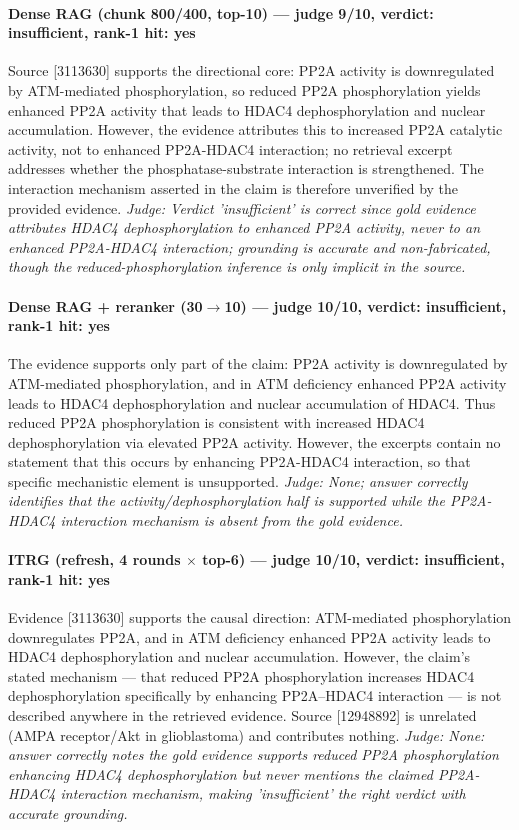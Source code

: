 \documentclass[sigconf, review, anonymous]{acmart}
\begin{document}
\paragraph{Dense RAG (chunk 800/400, top-10) --- judge 9/10, verdict: insufficient, rank-1 hit: yes}
\noindent Source [3113630] supports the directional core: PP2A activity is downregulated by ATM-mediated phosphorylation, so reduced PP2A phosphorylation yields enhanced PP2A activity that leads to HDAC4 dephosphorylation and nuclear accumulation. However, the evidence attributes this to increased PP2A catalytic activity, not to enhanced PP2A-HDAC4 interaction; no retrieval excerpt addresses whether the phosphatase-substrate interaction is strengthened. The interaction mechanism asserted in the claim is therefore unverified by the provided evidence.
\noindent\small\textit{Judge: Verdict 'insufficient' is correct since gold evidence attributes HDAC4 dephosphorylation to enhanced PP2A activity, never to an enhanced PP2A-HDAC4 interaction; grounding is accurate and non-fabricated, though the reduced-phosphorylation inference is only implicit in the source.}
\paragraph{Dense RAG + reranker (30$\to$10) --- judge 10/10, verdict: insufficient, rank-1 hit: yes}
\noindent The evidence supports only part of the claim: PP2A activity is downregulated by ATM-mediated phosphorylation, and in ATM deficiency enhanced PP2A activity leads to HDAC4 dephosphorylation and nuclear accumulation of HDAC4. Thus reduced PP2A phosphorylation is consistent with increased HDAC4 dephosphorylation via elevated PP2A activity. However, the excerpts contain no statement that this occurs by enhancing PP2A-HDAC4 interaction, so that specific mechanistic element is unsupported.
\noindent\small\textit{Judge: None; answer correctly identifies that the activity/dephosphorylation half is supported while the PP2A-HDAC4 interaction mechanism is absent from the gold evidence.}
\paragraph{ITRG (refresh, 4 rounds $\times$ top-6) --- judge 10/10, verdict: insufficient, rank-1 hit: yes}
\noindent Evidence [3113630] supports the causal direction: ATM-mediated phosphorylation downregulates PP2A, and in ATM deficiency enhanced PP2A activity leads to HDAC4 dephosphorylation and nuclear accumulation. However, the claim's stated mechanism --- that reduced PP2A phosphorylation increases HDAC4 dephosphorylation specifically by enhancing PP2A--HDAC4 interaction --- is not described anywhere in the retrieved evidence. Source [12948892] is unrelated (AMPA receptor/Akt in glioblastoma) and contributes nothing.
\noindent\small\textit{Judge: None: answer correctly notes the gold evidence supports reduced PP2A phosphorylation enhancing HDAC4 dephosphorylation but never mentions the claimed PP2A-HDAC4 interaction mechanism, making 'insufficient' the right verdict with accurate grounding.}
\end{document}

